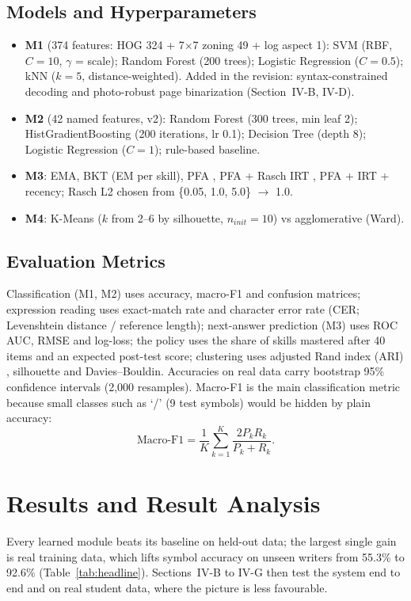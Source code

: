 \documentclass[conference]{IEEEtran}
\begin{document}
\subsection{Models and Hyperparameters}
\begin{itemize}
\item \textbf{M1} (374 features: HOG \cite{hog} 324 + 7$\times$7 zoning 49 + log aspect 1): SVM \cite{svm} (RBF, $C=10$, $\gamma$ = scale); Random Forest (200 trees); Logistic Regression ($C=0.5$); kNN ($k=5$, distance-weighted). Added in the revision: syntax-constrained decoding and photo-robust page binarization (Section~IV-B, IV-D).
\item \textbf{M2} (42 named features, v2): Random Forest \cite{rf} (300 trees, min leaf 2); HistGradientBoosting (200 iterations, lr 0.1); Decision Tree (depth 8); Logistic Regression ($C=1$); rule-based baseline.
\item \textbf{M3}: EMA, BKT \cite{bkt} (EM per skill), PFA \cite{pfa}, PFA + Rasch IRT \cite{rasch}, PFA + IRT + recency; Rasch L2 chosen from \{0.05, 1.0, 5.0\} $\rightarrow$ 1.0.
\item \textbf{M4}: K-Means ($k$ from 2--6 by silhouette, $n_{init}=10$) vs agglomerative (Ward).
\end{itemize}

\subsection{Evaluation Metrics}
Classification (M1, M2) uses accuracy, macro-F1 and confusion matrices; expression reading uses exact-match rate and character error rate (CER; Levenshtein distance / reference length); next-answer prediction (M3) uses ROC AUC, RMSE and log-loss; the policy uses the share of skills mastered after 40 items and an expected post-test score; clustering uses adjusted Rand index (ARI) \cite{ari}, silhouette and Davies--Bouldin. Accuracies on real data carry bootstrap 95\% confidence intervals (2,000 resamples). Macro-F1 is the main classification metric because small classes such as `/' (9 test symbols) would be hidden by plain accuracy:
\begin{equation}
\text{Macro-F1} = \frac{1}{K}\sum_{k=1}^{K} \frac{2 P_k R_k}{P_k + R_k}.
\end{equation}

\section{Results and Result Analysis}
Every learned module beats its baseline on held-out data; the largest single gain is real training data, which lifts symbol accuracy on unseen writers from 55.3\% to 92.6\% (Table~\ref{tab:headline}). Sections~IV-B to IV-G then test the system end to end and on real student data, where the picture is less favourable.
\end{document}
